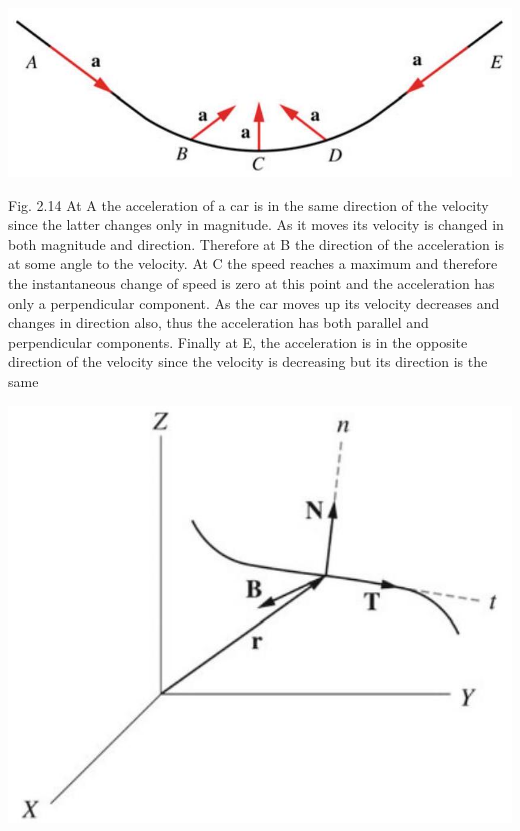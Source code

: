 \documentclass[10pt]{article}
\begin{document}
\begin{center}
\includegraphics[max width=\textwidth]{2024_09_13_db1f357d2aad0a03eb2eg-032(2)}
\end{center}

Fig. 2.14 At A the acceleration of a car is in the same direction of the velocity since the latter changes only in magnitude. As it moves its velocity is changed in both magnitude and direction. Therefore at B the direction of the acceleration is at some angle to the velocity. At C the speed reaches a maximum and therefore the instantaneous change of speed is zero at this point and the acceleration has only a perpendicular component. As the car moves up its velocity decreases and changes in direction also, thus the acceleration has both parallel and perpendicular components. Finally at E, the acceleration is in the opposite direction of the velocity since the velocity is decreasing but its direction is the same

\begin{center}
\includegraphics[max width=\textwidth]{2024_09_13_db1f357d2aad0a03eb2eg-032(4)}
\end{center}
\end{document}
